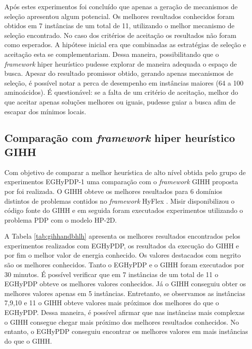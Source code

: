 	Após estes experimentos foi concluído que apenas a geração de mecanismos de seleção apresentou algum potencial. Os melhores resultados conhecidos foram obtidos em 7 instâncias de um total de 11, utilizando o melhor mecanismo de seleção encontrado. No caso dos critérios de aceitação os resultados não foram como esperados. A hipótese inicial era que combinadas as estratégias de seleção e aceitação esta se complementariam. Dessa maneira, possibilitando que o \textit{framework} hiper heurístico pudesse explorar de maneira adequada o espaço de busca. Apesar do resultado promissor obtido, gerando apenas mecanismos de seleção, é possível notar a perca de desempenho em instâncias maiores (64 a 100 aminoácidos). É questionável: se a falta de um critério de aceitação, melhor do que aceitar apenas soluções melhores ou iguais, pudesse guiar a busca afim de escapar dos mínimos locais. 

	
	
	\subsection{Comparação com \textit{framework} hiper heurístico GIHH}
	
	Com objetivo de comparar a melhor heurística de alto nível obtida pelo grupo de experimentos EGHyPDP-1 uma comparação com o \textit{framework} GIHH proposta por \cite{misir2012intelligent} foi realizada. O GIHH obteve os melhores resultados para 6  domínios distintos de problemas contidos no \textit{framework} HyFlex \cite{ochoa2012hyflex}. Misir disponibilizou o código fonte do GIHH e em seguida foram executados experimentos utilizando o problema PDP com o modelo HP-2D.
	
	A Tabela \ref{tab:gihhandbhlh} apresenta os melhores resultados encontrados pelos experimentos realizados com EGHyPDP, os resultados da execução do GIHH e por fim o melhor valor de energia conhecido. Os valores destacados com negrito são os melhores conhecidos. Tanto o EGHyPDP e o GIHH foram executados por 30 minutos. É possível verificar que em 7 instâncias de um total de 11 o EGHyPDP obteve os melhores valores conhecidos. Já o GIHH conseguiu obter os melhores valores apenas em 5 instâncias. Entretanto, se observamos as instâncias 7,9,10 e 11 o GIHH obteve valores mais próximos dos melhores do que o EGHyPDP. Dessa maneira, é possível afirmar que nas instâncias mais complexas o GIHH consegue chegar mais próximo dos melhores resultados conhecidos. No entanto, o EGHyPDP conseguiu encontrar os melhores valores em mais instâncias do que o GIHH. 
	
